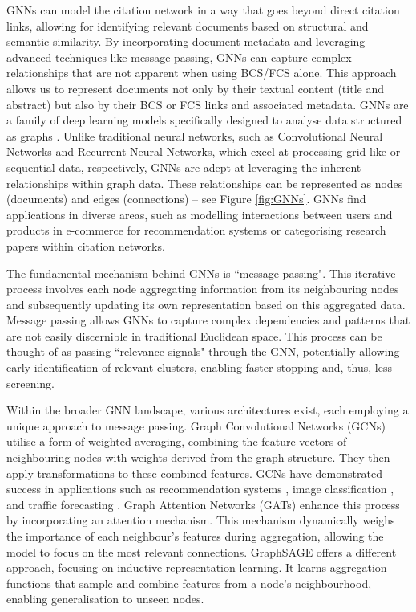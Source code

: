 \documentclass[10pt,oneside]{book}
\begin{document}
GNNs can model the citation network in a way that goes beyond direct citation links, allowing for identifying relevant documents based on structural and semantic similarity. By incorporating document metadata and leveraging advanced techniques like message passing, GNNs can capture complex relationships that are not apparent when using BCS/FCS alone. This approach allows us to represent documents not only by their textual content (title and abstract) but also by their BCS or FCS links and associated metadata. GNNs are a family of deep learning models specifically designed to analyse data structured as graphs \cite{lee_attention_2018, wu_comprehensive_2021, bronstein_geometric_2017, khemani_review_2024}. Unlike traditional neural networks, such as Convolutional Neural Networks and Recurrent Neural Networks, which excel at processing grid-like or sequential data, respectively, GNNs are adept at leveraging the inherent relationships within graph data. These relationships can be represented as nodes (documents) and edges (connections) – see Figure \ref{fig:GNNs}. GNNs find applications in diverse areas, such as modelling interactions between users and products in e-commerce for recommendation systems or categorising research papers within citation networks. 

The fundamental mechanism behind GNNs is ``message passing". This iterative process involves each node aggregating information from its neighbouring nodes and subsequently updating its own representation based on this aggregated data. Message passing allows GNNs to capture complex dependencies and patterns that are not easily discernible in traditional Euclidean space. This process can be thought of as passing ``relevance signals" through the GNN, potentially allowing early identification of relevant clusters, enabling faster stopping and, thus, less screening.

Within the broader GNN landscape, various architectures exist, each employing a unique approach to message passing. Graph Convolutional Networks (GCNs) \cite{berg_graph_2017} utilise a form of weighted averaging, combining the feature vectors of neighbouring nodes with weights derived from the graph structure. They then apply transformations to these combined features. GCNs have demonstrated success in applications such as recommendation systems \cite{fan_graph_2019}, image classification \cite{monti_geometric_2016}, and traffic forecasting \cite{cui_traffic_2020}. Graph Attention Networks (GATs) enhance this process by incorporating an attention mechanism. This mechanism dynamically weighs the importance of each neighbour's features during aggregation, allowing the model to focus on the most relevant connections. GraphSAGE offers a different approach, focusing on inductive representation learning. It learns aggregation functions that sample and combine features from a node's neighbourhood, enabling generalisation to unseen nodes. 
\end{document}
